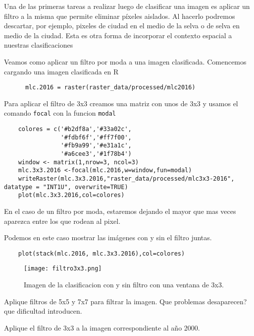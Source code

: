 Una de las primeras tareas a realizar luego de clasificar una imagen es aplicar un filtro a la misma que permite eliminar p\'ixeles aislados. Al hacerlo podremos descartar, por ejemplo, pixeles de ciudad en el medio de la selva o de selva en medio de la ciudad. Esta es otra forma de incorporar el contexto espacial a nuestras clasificaciones
\begin{exa}
  Veamos como aplicar un filtro por moda a una imagen clasificada. Comencemos cargando una imagen clasificada en R

  \begin{lstlisting}
      mlc.2016 = raster(raster_data/processed/mlc2016)
  \end{lstlisting}

  Para aplicar el filtro de 3x3 creamos una matriz con unos de 3x3 y usamos
  el comando \texttt{focal} con la funcion \texttt{modal}

  \begin{lstlisting}
    colores = c('#b2df8a','#33a02c',
                '#fdbf6f','#ff7f00',
                '#fb9a99','#e31a1c',
                '#a6cee3','#1f78b4')
    window <- matrix(1,nrow=3, ncol=3)
    mlc.3x3.2016 <-focal(mlc.2016,w=window,fun=modal)
    writeRaster(mlc.3x3.2016,"raster_data/processed/mlc3x3-2016", datatype = "INT1U", overwrite=TRUE)
    plot(mlc.3x3.2016,col=colores)
  \end{lstlisting}
  En el caso de un filtro por moda, estaremos dejando el mayor que mas veces aparezca entre los que rodean al pixel.

  Podemos en este caso mostrar las im\'agenes con y sin el filtro juntas.

  \begin{lstlisting}
    plot(stack(mlc.2016, mlc.3x3.2016),col=colores)
  \end{lstlisting}
  \begin{figure}
    \texttt{[image: filtro3x3.png]}
    \caption{Imagen de la clasificacion con y sin filtro con una ventana de 3x3.}
    \label{fig:3x3}
  \end{figure}
\end{exa}

\begin{act}
    Aplique filtros de 5x5 y 7x7 para filtrar la imagen. Que problemas desaparecen? que dificultad introducen.
\end{act}

\begin{act}
    Aplique el filtro de 3x3 a la imagen correspondiente al año 2000.
\end{act}

